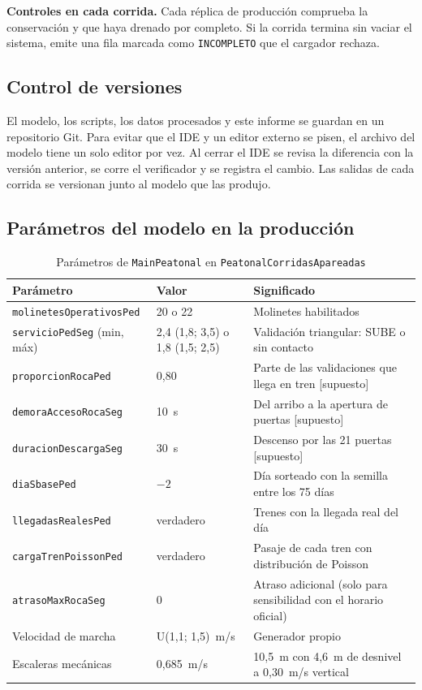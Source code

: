 \textbf{Controles en cada corrida.} Cada réplica de producción comprueba la conservación y que haya
drenado por completo. Si la corrida termina sin vaciar el sistema, emite una fila marcada como
\texttt{INCOMPLETO} que el cargador rechaza.

\subsection{Control de versiones}
\label{anx:versiones}

El modelo, los scripts, los datos procesados y este informe se guardan en un repositorio Git. Para evitar
que el IDE y un editor externo se pisen, el archivo del modelo tiene un solo editor por vez. Al cerrar el
IDE se revisa la diferencia con la versión anterior, se corre el verificador y se registra el cambio. Las
salidas de cada corrida se versionan junto al modelo que las produjo.

\subsection{Parámetros del modelo en la producción}
\label{anx:parametros}

\begin{table}[H]
\centering
\caption{Parámetros de \texttt{MainPeatonal} en \texttt{PeatonalCorridasApareadas}}
\label{tab:anx-parametros}
\small
\begin{tabularx}{\textwidth}{@{}>{\raggedright\arraybackslash}p{4.4cm} l X@{}}
\toprule
Parámetro & Valor & Significado \\
\midrule
\texttt{molinetesOperativosPed} & 20 o 22 & Molinetes habilitados \\
\texttt{servicioPedSeg} (min, máx) & 2,4 (1,8; 3,5) o 1,8 (1,5; 2,5) & Validación triangular: SUBE o sin contacto \\
\texttt{proporcionRocaPed} & 0,80 & Parte de las validaciones que llega en tren [supuesto] \\
\texttt{demoraAccesoRocaSeg} & 10~s & Del arribo a la apertura de puertas [supuesto] \\
\texttt{duracionDescargaSeg} & 30~s & Descenso por las 21 puertas [supuesto] \\
\texttt{diaSbasePed} & $-2$ & Día sorteado con la semilla entre los 75 días \\
\texttt{llegadasRealesPed} & verdadero & Trenes con la llegada real del día \\
\texttt{cargaTrenPoissonPed} & verdadero & Pasaje de cada tren con distribución de Poisson \\
\texttt{atrasoMaxRocaSeg} & 0 & Atraso adicional (solo para sensibilidad con el horario oficial) \\
Velocidad de marcha & U(1,1; 1,5)~m/s & Generador propio \\
Escaleras mecánicas & 0,685~m/s & 10,5~m con 4,6~m de desnivel a 0,30~m/s vertical \\
\bottomrule
\end{tabularx}
\end{table}


